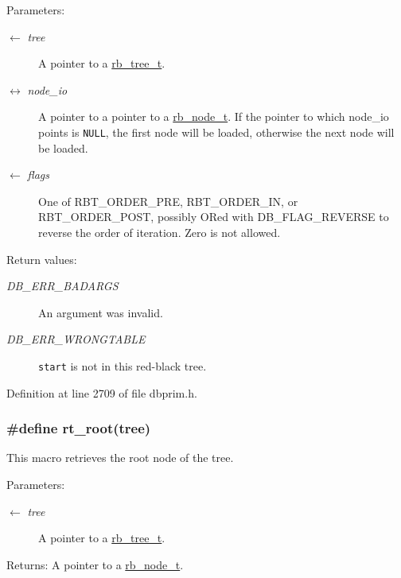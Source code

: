 \begin{Desc}
\item[Parameters:]
\begin{description}
\item[\mbox{$\leftarrow$} {\em tree}]A pointer to a \hyperlink{group__dbprim__rbtree_ga0}{rb\_\-tree\_\-t}. \item[\mbox{$\leftrightarrow$} {\em node\_\-io}]A pointer to a pointer to a \hyperlink{group__dbprim__rbtree_ga1}{rb\_\-node\_\-t}. If the pointer to which node\_\-io points is {\tt NULL}, the first node will be loaded, otherwise the next node will be loaded. \item[\mbox{$\leftarrow$} {\em flags}]One of RBT\_\-ORDER\_\-PRE, RBT\_\-ORDER\_\-IN, or RBT\_\-ORDER\_\-POST, possibly ORed with DB\_\-FLAG\_\-REVERSE to reverse the order of iteration. Zero is not allowed.\end{description}
\end{Desc}
\begin{Desc}
\item[Return values:]
\begin{description}
\item[{\em DB\_\-ERR\_\-BADARGS}]An argument was invalid. \item[{\em DB\_\-ERR\_\-WRONGTABLE}]{\tt start} is not in this red-black tree.\end{description}
\end{Desc}


Definition at line 2709 of file dbprim.h.\hypertarget{group__dbprim__rbtree_ga21}{
\subsubsection[rt\_\-root]{\setlength{\rightskip}{0pt plus 5cm}\#define rt\_\-root(tree)}}
\label{group__dbprim__rbtree_ga21}


This macro retrieves the root node of the tree.

\begin{Desc}
\item[Parameters:]
\begin{description}
\item[\mbox{$\leftarrow$} {\em tree}]A pointer to a \hyperlink{group__dbprim__rbtree_ga0}{rb\_\-tree\_\-t}.\end{description}
\end{Desc}
\begin{Desc}
\item[Returns:]A pointer to a \hyperlink{group__dbprim__rbtree_ga1}{rb\_\-node\_\-t}.\end{Desc}


